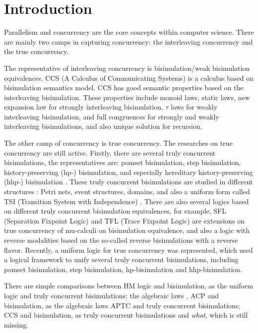 \section{Introduction}\label{int}

Parallelism and concurrency \cite{CM} are the core concepts within computer science. There are mainly two camps in capturing concurrency: the interleaving concurrency and the true concurrency.

The representative of interleaving concurrency is bisimulation/weak bisimulation equivalences. CCS (A Calculus of Communicating Systems) \cite{CCS} \cite{CC} is a calculus based on bisimulation semantics model. CCS has good semantic properties based on the interleaving bisimulation. These properties include monoid laws, static laws, new expansion law for strongly interleaving bisimulation, $\tau$ laws for weakly interleaving bisimulation, and full congruences for strongly and weakly interleaving bisimulations, and also unique solution for recursion.

The other camp of concurrency is true concurrency. The researches on true concurrency are still active. Firstly, there are several truly concurrent bisimulations, the representatives are: pomset bisimulation, step bisimulation, history-preserving (hp-) bisimulation, and especially hereditary history-preserving (hhp-) bisimulation \cite{HHP1} \cite{HHP2}. These truly concurrent bisimulations are studied in different structures \cite{ES1} \cite{ES2} \cite{CM}: Petri nets, event structures, domains, and also a uniform form called TSI (Transition System with Independence) \cite{SFL}. There are also several logics based on different truly concurrent bisimulation equivalences, for example, SFL (Separation Fixpoint Logic) and TFL (Trace Fixpoint Logic) \cite{SFL} are extensions on true concurrency of mu-calculi \cite{MUC} on bisimulation equivalence, and also a logic with reverse modalities \cite {RL1} \cite{RL2} based on the so-called reverse bisimulations with a reverse flavor. Recently, a uniform logic for true concurrency \cite{LTC1} \cite{LTC2} was represented, which used a logical framework to unify several truly concurrent bisimulations, including pomset bisimulation, step bisimulation, hp-bisimulation and hhp-bisimulation.

There are simple comparisons between HM logic and bisimulation, as the uniform logic \cite{LTC1} \cite{LTC2} and truly concurrent bisimulations; the algebraic laws \cite{ALNC}, ACP \cite{ACP} and bisimulation, as the algebraic laws APTC \cite{ATC} and truly concurrent bisimulations; CCS and bisimulation, as truly concurrent bisimulations  and \emph{what}, which is still missing.

